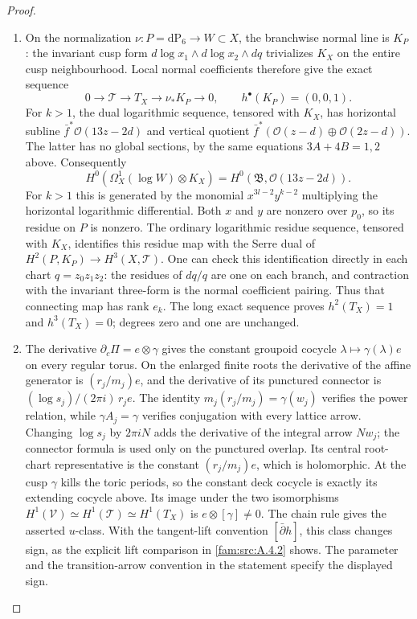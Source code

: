 \begin{proof}
\begin{enumerate}[label=\arabic*.,leftmargin=*]
\item On the normalization $\nu:P=\mathrm{dP}_6\to W\subset X$,
the branchwise normal line is $K_P$: the invariant cusp form
$d\log x_1\wedge d\log x_2\wedge dq$ trivializes $K_X$
on the entire cusp neighbourhood.  Local normal coefficients
therefore give the exact sequence
\[
 0\longrightarrow\mathcal T\longrightarrow T_X
 \longrightarrow\nu_*K_P\longrightarrow0,
 \qquad h^\bullet(K_P)=(0,0,1).
\]
For $k>1$, the dual logarithmic sequence, tensored with $K_X$, has horizontal
subline $\bar f^*\mathcal O(13z-2d)$ and vertical quotient
$\bar f^*(\mathcal O(z-d)\oplus\mathcal O(2z-d))$.
The latter has no global sections, by the same equations
$3A+4B=1,2$ above.  Consequently
\[
 H^0(\Omega_X^1(\log W)\otimes K_X)
 =H^0(\mathfrak B,\mathcal O(13z-2d)).
\]
For $k>1$ this is generated by the monomial
$x^{3l-2}y^{k-2}$ multiplying the horizontal logarithmic
differential.  Both $x$ and $y$ are nonzero over $p_0$, so its
residue on $P$ is nonzero.  The ordinary logarithmic residue
sequence, tensored with $K_X$, identifies this residue map with
the Serre dual of
$H^2(P,K_P)\to H^3(X,\mathcal T)$.
One can check this identification directly in each chart
$q=z_0z_1z_2$: the residues of $dq/q$ are one on each branch,
and contraction with the invariant three-form is the normal
coefficient pairing.  Thus that connecting map has rank $e_k$.
The long exact sequence proves $h^2(T_X)=1$ and $h^3(T_X)=0$;
degrees zero and one are unchanged.

\item The derivative $\partial_c\Pi=e\otimes\gamma$ gives the constant
groupoid cocycle $\lambda\mapsto\gamma(\lambda)e$ on every
regular torus.  On the enlarged finite roots the derivative of the
affine generator is $(r_j/m_j)e$, and the derivative of its
punctured connector is $(\log s_j)/(2\pi i)\,r_je$.
The identity $m_j(r_j/m_j)=\gamma(w_j)$ verifies the power
relation, while $\gamma A_j=\gamma$ verifies conjugation with
every lattice arrow.  Changing $\log s_j$ by $2\pi i N$
adds the derivative of the integral arrow $Nw_j$; the connector
formula is used only on the punctured overlap.  Its central
root-chart representative is the constant $(r_j/m_j)e$,
which is holomorphic.  At the cusp $\gamma$ kills the toric periods,
so the constant deck cocycle is exactly its extending cocycle
above.  Its image under the two isomorphisms
$H^1(\mathcal V)\simeq H^1(\mathcal T)\simeq H^1(T_X)$
is $e\otimes[\gamma]\ne0$.  The chain rule gives the asserted
$u$-class.  With the tangent-lift convention $[\bar\partial h]$, this
class changes sign, as the explicit lift comparison in
\cref{fam:src:A.4.2} shows. The parameter and the transition-arrow
convention in the statement specify the displayed sign.


\end{enumerate}
\end{proof}
